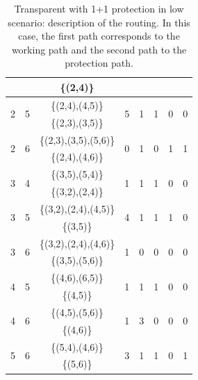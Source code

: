 \begin{table}[h!]
\begin{tabular}{|| c | c | c | c | c | c | c | c ||}
 & & \{(2,4)\} & & & & & \\ \hline
 \multirow{2}{*}{2} & \multirow{2}{*}{5} & \{(2,4),(4,5)\} & \multirow{2}{*}{5} & \multirow{2}{*}{1} & \multirow{2}{*}{1} & \multirow{2}{*}{0} & \multirow{2}{*}{0}\\
 & & \{(2,3),(3,5)\} & & & & & \\ \hline
 \multirow{2}{*}{2} & \multirow{2}{*}{6} & \{(2,3),(3,5),(5,6)\} & \multirow{2}{*}{0} & \multirow{2}{*}{1} & \multirow{2}{*}{0} & \multirow{2}{*}{1} & \multirow{2}{*}{1}\\
 & & \{(2,4),(4,6)\} & & & & & \\ \hline
 \multirow{2}{*}{3} & \multirow{2}{*}{4} & \{(3,5),(5,4)\} & \multirow{2}{*}{1} & \multirow{2}{*}{1} & \multirow{2}{*}{1} & \multirow{2}{*}{0} & \multirow{2}{*}{0}\\
 & & \{(3,2),(2,4)\} & & & & & \\ \hline
 \multirow{2}{*}{3} & \multirow{2}{*}{5} & \{(3,2),(2,4),(4,5)\} & \multirow{2}{*}{4} & \multirow{2}{*}{1} & \multirow{2}{*}{1} & \multirow{2}{*}{1} & \multirow{2}{*}{0}\\
 & & \{(3,5)\} & & & & & \\ \hline
 \multirow{2}{*}{3} & \multirow{2}{*}{6} & \{(3,2),(2,4),(4,6)\} & \multirow{2}{*}{1} & \multirow{2}{*}{0} & \multirow{2}{*}{0} & \multirow{2}{*}{0} & \multirow{2}{*}{0}\\
 & & \{(3,5),(5,6)\} & & & & & \\ \hline
 \multirow{2}{*}{4} & \multirow{2}{*}{5} & \{(4,6),(6,5)\} & \multirow{2}{*}{1} & \multirow{2}{*}{1} & \multirow{2}{*}{1} & \multirow{2}{*}{0} & \multirow{2}{*}{0}\\
 & & \{(4,5)\} & & & & & \\ \hline
 \multirow{2}{*}{4} & \multirow{2}{*}{6} & \{(4,5),(5,6)\} & \multirow{2}{*}{1} & \multirow{2}{*}{3} & \multirow{2}{*}{0} & \multirow{2}{*}{0} & \multirow{2}{*}{0}\\
 & & \{(4,6)\} & & & & & \\ \hline
 \multirow{2}{*}{5} & \multirow{2}{*}{6} & \{(5,4),(4,6)\} & \multirow{2}{*}{3} & \multirow{2}{*}{1} & \multirow{2}{*}{1} & \multirow{2}{*}{0} & \multirow{2}{*}{1}\\
 & & \{(5,6)\} & & & & & \\
 \hline
\end{tabular}
\caption{Transparent with 1+1 protection in low scenario: description of the routing. In this case, the first path corresponds to the working path and the second path to the protection path.}
\label{path_transp_protec_ref_low}
\end{table}

